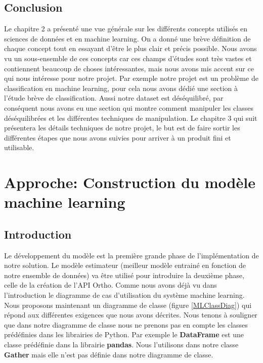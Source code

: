 \documentclass[12pt, french]{report}
\begin{document}
\section{Conclusion}
Le chapitre 2 a présenté une vue générale sur les différents concepts utilisés en sciences de données et en machine learning. On a donné une brève définition de chaque concept tout en essayant d'être le plus clair et précis possible. Nous avons vu un sous-ensemble de ces concepts car ces champs d'études sont très vastes et contiennent beaucoup de choses intéressantes, mais nous avons mis accent sur ce qui nous intéresse pour notre projet. Par exemple notre projet est un problème de classification en machine learning, pour cela nous avons dédié une section à l'étude brève de classification. Aussi notre dataset est déséquilibré, par conséquent nous avons eu une section qui montre comment manipuler les classes déséquilibrées et les différentes techniques de manipulation. Le chapitre 3 qui suit présentera les détails techniques de notre projet, le but est de faire sortir les différentes étapes que nous avons suivies pour arriver à un produit fini et utilisable.

 




%
%
%
%
%



\newpage

\chapter{Approche: Construction du modèle machine learning}
\section{Introduction}

Le développement du modèle est la première grande phase de l'implémentation de notre solution. Le modèle estimateur (meilleur modèle entrainé en fonction de notre ensemble de données) va être utilisé pour introduire la deuxième phase, celle de la création de l'API Ortho. Comme nous avons déjà vu dans l'introduction le diagramme de cas d'utilisation du système machine learning. Nous proposons maintenant un diagramme de classe (figure \ref{MLClassDiag}) qui répond aux différentes exigences que nous avons décrites. Nous tenons à souligner que dans notre diagramme de classe nous ne prenons pas en compte les classes prédéfinies dans les librairies de Python. Par exemple le \textbf{DataFrame} est une classe prédéfinie dans la librairie \textbf{pandas}. Nous l'utilisons dans notre classe \textbf{Gather} mais elle n'est pas définie dans notre diagramme de classe.  \\ 
\end{document}

